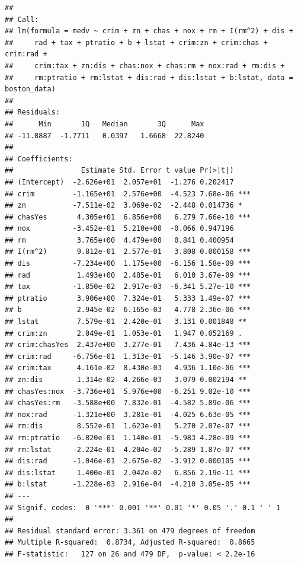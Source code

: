 \documentclass[
]{article}
\begin{document}
\begin{verbatim}
## 
## Call:
## lm(formula = medv ~ crim + zn + chas + nox + rm + I(rm^2) + dis + 
##     rad + tax + ptratio + b + lstat + crim:zn + crim:chas + crim:rad + 
##     crim:tax + zn:dis + chas:nox + chas:rm + nox:rad + rm:dis + 
##     rm:ptratio + rm:lstat + dis:rad + dis:lstat + b:lstat, data = boston_data)
## 
## Residuals:
##      Min       1Q   Median       3Q      Max 
## -11.8887  -1.7711   0.0397   1.6668  22.8240 
## 
## Coefficients:
##                Estimate Std. Error t value Pr(>|t|)    
## (Intercept)  -2.626e+01  2.057e+01  -1.276 0.202417    
## crim         -1.165e+01  2.576e+00  -4.523 7.68e-06 ***
## zn           -7.511e-02  3.069e-02  -2.448 0.014736 *  
## chasYes       4.305e+01  6.856e+00   6.279 7.66e-10 ***
## nox          -3.452e-01  5.210e+00  -0.066 0.947196    
## rm            3.765e+00  4.479e+00   0.841 0.400954    
## I(rm^2)       9.812e-01  2.577e-01   3.808 0.000158 ***
## dis          -7.234e+00  1.175e+00  -6.156 1.58e-09 ***
## rad           1.493e+00  2.485e-01   6.010 3.67e-09 ***
## tax          -1.850e-02  2.917e-03  -6.341 5.27e-10 ***
## ptratio       3.906e+00  7.324e-01   5.333 1.49e-07 ***
## b             2.945e-02  6.165e-03   4.778 2.36e-06 ***
## lstat         7.579e-01  2.420e-01   3.131 0.001848 ** 
## crim:zn       2.049e-01  1.053e-01   1.947 0.052169 .  
## crim:chasYes  2.437e+00  3.277e-01   7.436 4.84e-13 ***
## crim:rad     -6.756e-01  1.313e-01  -5.146 3.90e-07 ***
## crim:tax      4.161e-02  8.430e-03   4.936 1.10e-06 ***
## zn:dis        1.314e-02  4.266e-03   3.079 0.002194 ** 
## chasYes:nox  -3.736e+01  5.976e+00  -6.251 9.02e-10 ***
## chasYes:rm   -3.588e+00  7.832e-01  -4.582 5.89e-06 ***
## nox:rad      -1.321e+00  3.281e-01  -4.025 6.63e-05 ***
## rm:dis        8.552e-01  1.623e-01   5.270 2.07e-07 ***
## rm:ptratio   -6.820e-01  1.140e-01  -5.983 4.28e-09 ***
## rm:lstat     -2.224e-01  4.204e-02  -5.289 1.87e-07 ***
## dis:rad      -1.046e-01  2.675e-02  -3.912 0.000105 ***
## dis:lstat     1.400e-01  2.042e-02   6.856 2.19e-11 ***
## b:lstat      -1.228e-03  2.916e-04  -4.210 3.05e-05 ***
## ---
## Signif. codes:  0 '***' 0.001 '**' 0.01 '*' 0.05 '.' 0.1 ' ' 1
## 
## Residual standard error: 3.361 on 479 degrees of freedom
## Multiple R-squared:  0.8734, Adjusted R-squared:  0.8665 
## F-statistic:   127 on 26 and 479 DF,  p-value: < 2.2e-16
\end{verbatim}
\end{document}
